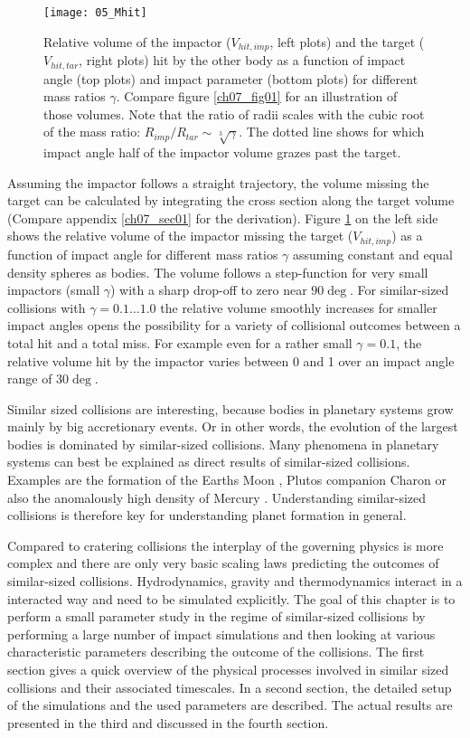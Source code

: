 \begin{figure}[htbp]
\begin{center}
\texttt{[image: 05\_Mhit]}
\caption{Relative volume of the impactor ($V_{hit, imp}$, left plots) and the target ($V_{hit, tar}$, right plots) hit by the other body as a function of impact angle (top plots) and impact parameter (bottom plots) for different mass ratios $\gamma$. Compare figure \ref{ch07_fig01} for an illustration of those volumes. Note that the ratio of radii scales with the cubic root of the mass ratio: $R_{imp} / R_{tar} \sim \sqrt[3]{\gamma}$. The dotted line shows for which impact angle half of the impactor volume grazes past the target. } 
\label{ch03_fig05}
\end{center}
\end{figure}

Assuming the impactor follows a straight trajectory, the volume missing the target can be calculated by integrating the cross section along the target volume (Compare appendix \ref{ch07_sec01} for the derivation). Figure \ref{ch03_fig05} on the left side shows the relative volume of the impactor missing the target ($V_{hit, imp}$) as a function of impact angle for different mass ratios $\gamma$ assuming constant and equal density spheres as bodies. The volume follows a step-function for very small impactors (small $\gamma$) with a sharp drop-off to zero near $90 \deg$. For similar-sized collisions with $\gamma = 0.1 \dots 1.0$ the relative volume smoothly increases for smaller impact angles opens the possibility for a variety of collisional outcomes between a total hit and a total miss. For example even for a rather small $\gamma = 0.1$, the relative volume hit by the impactor varies between 0 and 1 over an impact angle range of $30 \deg$.

Similar sized collisions are interesting, because bodies in planetary systems grow mainly by big accretionary events. Or in other words, the evolution of the largest bodies is dominated by similar-sized collisions. Many phenomena in planetary systems can best be explained as direct results of similar-sized collisions. Examples are the formation of the Earths Moon \citep{Benz:1985p1755}, Plutos companion Charon \cite{Canup:2005p1987} or also the anomalously high density of Mercury \cite{Benz:1988p3336}. Understanding similar-sized collisions is therefore key for understanding planet formation in general.

Compared to cratering collisions the interplay of the governing physics is more complex and there are only very basic scaling laws predicting the outcomes of similar-sized collisions. Hydrodynamics, gravity and thermodynamics interact in a interacted way and need to be simulated explicitly. The goal of this chapter is to perform a small parameter study in the regime of similar-sized collisions by performing a large number of impact simulations and then looking at various characteristic parameters describing the outcome of the collisions. The first section gives a quick overview of the physical processes involved in similar sized collisions and their associated timescales. In a second section, the detailed setup of the simulations and the used parameters are described. The actual results are presented in the third and discussed in the fourth section.

